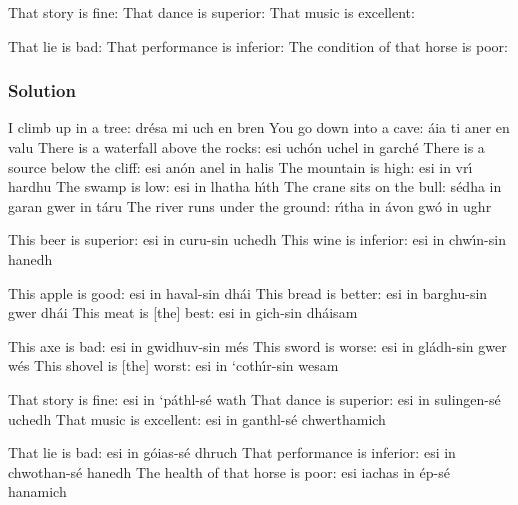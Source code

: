 That story is fine:
That dance is superior:
That music is excellent:

That lie is bad:
That performance is inferior:
The condition of that horse is poor:

\newpage
\subsubsection{Solution}

I climb up in a tree: dr\'{e}sa mi uch en bren
You go down into a cave: \'{a}ia ti aner en valu
There is a waterfall above the rocks: esi uch\'{o}n uchel in garch\'{e}
There is a source below the cliff: esi an\'{o}n anel in halis
The mountain is high: esi in vr\'{\i} hardhu
The swamp is low: esi in lhatha h\'{\i}th
The crane sits on the bull: s\'{e}dha in garan gwer in t\'{a}ru
The river runs under the ground: r\'{\i}tha in \'{a}von gw\'{o} in ughr

This beer is superior: esi in curu-sin uchedh
This wine is inferior: esi in chw\'{\i}n-sin hanedh

This apple is good: esi in haval-sin dh\'{a}i
This bread is better: esi in barghu-sin gwer dh\'{a}i
This meat is [the] best: esi in gich-sin dh\'{a}isam

This axe is bad: esi in gwidhuv-sin m\'{e}s
This sword is worse: esi in gl\'{a}dh-sin gwer w\'{e}s
This shovel is [the] worst: esi in ‘coth\'{\i}r-sin wesam

That story is fine: esi in ‘p\'{a}thl-s\'{e} wath
That dance is superior: esi in sulingen-s\'{e} uchedh
That music is excellent: esi in ganthl-s\'{e} chwerthamich

That lie is bad: esi in g\'{o}ias-s\'{e} dhruch
That performance is inferior: esi in chwothan-s\'{e} hanedh
The health of that horse is poor: esi iachas in \'{e}p-s\'{e} hanamich

